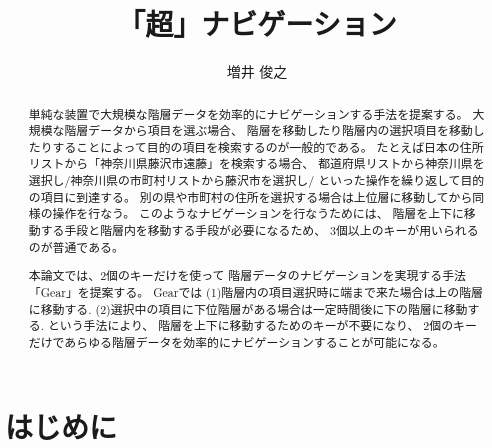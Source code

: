 \documentclass[twoside]{wiss}
\def\GEAR{\textsf{Gear}}
\begin{document}
\title{「超」ナビゲーション}
\etitle{} %

\author{増井 俊之}

\begin{abstract}
単純な装置で大規模な階層データを効率的にナビゲーションする手法を提案する。
%
大規模な階層データから項目を選ぶ場合、
階層を移動したり階層内の選択項目を移動したりすることによって目的の項目を検索するのが一般的である。
たとえば日本の住所リストから「神奈川県藤沢市遠藤」を検索する場合、
都道府県リストから神奈川県を選択し/神奈川県の市町村リストから藤沢市を選択し/
といった操作を繰り返して目的の項目に到達する。
別の県や市町村の住所を選択する場合は上位層に移動してから同様の操作を行なう。
%
このようなナビゲーションを行なうためには、
階層を上下に移動する手段と階層内を移動する手段が必要になるため、
3個以上のキーが用いられるのが普通である。

本論文では、2個のキーだけを使って
階層データのナビゲーションを実現する手法「{\GEAR}」を提案する。
{\GEAR}では
(1)階層内の項目選択時に端まで来た場合は上の階層に移動する.
(2)選択中の項目に下位階層がある場合は一定時間後に下の階層に移動する.
という手法により、
階層を上下に移動するためのキーが不要になり、
2個のキーだけであらゆる階層データを効率的にナビゲーションすることが可能になる。
\end{abstract}

\maketitle

\section{はじめに}

\end{document}

